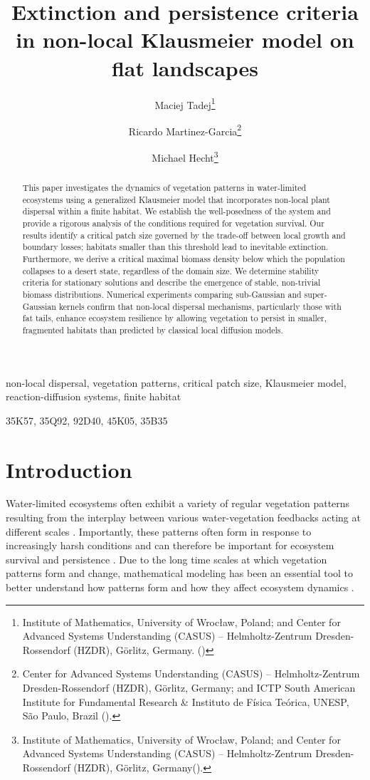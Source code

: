 \documentclass[review,onefignum,onetabnum]{SIAM-styles/siamart171218}
\title{Extinction and persistence criteria in non-local Klausmeier model on flat landscapes}
\author{Maciej Tadej\thanks{Institute of Mathematics, University of Wrocław, Poland; and Center for Advanced Systems Understanding (CASUS) -- Helmholtz-Zentrum Dresden-Rossendorf (HZDR), G\"orlitz, Germany. (\email{maciej.tadej@math.uni.wroc.pl})}
\and Ricardo Martinez-Garcia\thanks{Center for Advanced Systems Understanding (CASUS) -- Helmholtz-Zentrum Dresden-Rossendorf (HZDR), G\"orlitz, Germany; and ICTP South American Institute for Fundamental Research \& Instituto de F\'isica Te\'orica, UNESP, São Paulo, Brazil (\email{r.martinez-garcia@hzdr.de}).}
\and Michael Hecht\thanks{Institute of Mathematics, University of Wrocław, Poland; and  Center for Advanced Systems Understanding (CASUS) -- Helmholtz-Zentrum Dresden-Rossendorf (HZDR), G\"orlitz, Germany(\email{m.hecht@hzdr.de}).}
}
\begin{document}
\maketitle

\begin{abstract}
This paper investigates the dynamics of vegetation patterns in water-limited ecosystems using a generalized Klausmeier model that incorporates non-local plant dispersal within a finite habitat. We establish the well-posedness of the system and provide a rigorous analysis of the conditions required for vegetation survival. Our results identify a critical patch size governed by the trade-off between local growth and boundary losses; habitats smaller than this threshold lead to inevitable extinction. Furthermore, we derive a critical maximal biomass density below which the population collapses to a desert state, regardless of the domain size. We determine stability criteria for stationary solutions and describe the emergence of stable, non-trivial biomass distributions. Numerical experiments comparing sub-Gaussian and super-Gaussian kernels confirm that non-local dispersal mechanisms, particularly those with fat tails, enhance ecosystem resilience by allowing vegetation to persist in smaller, fragmented habitats than predicted by classical local diffusion models.
\end{abstract}

\begin{keywords}
non-local dispersal, vegetation patterns, critical patch size, Klausmeier model, reaction-diffusion systems, finite habitat
\end{keywords}

\begin{AMS}
35K57, 35Q92, 92D40, 45K05, 35B35
\end{AMS}

\section{Introduction}

Water-limited ecosystems often exhibit a variety of regular vegetation patterns \cite{Rietkerk2008,Tarnita2024,Martinez-Garcia2022} resulting from the interplay between various water-vegetation feedbacks acting at different scales \cite{Borgogno2009,Martinez-Garcia2014,Meron2018}. Importantly, these patterns often form in response to increasingly harsh conditions and can therefore be important for ecosystem survival and persistence \cite{Meron2016}. Due to the long time scales at which vegetation patterns form and change, mathematical modeling has been an essential tool to better understand how patterns form and how they affect ecosystem dynamics \cite{Meron2016,Martinez-Garcia2023}. 
\end{document}
